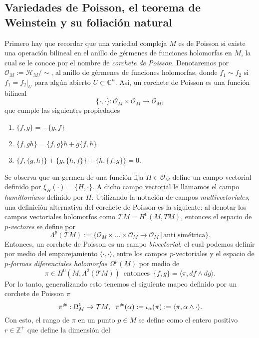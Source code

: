 \documentclass{article}
\newcommand{\zah}{\ensuremath{ \mathbb Z }}
\newcommand{\con}{\ensuremath{\mathbb{C}^n}}
\begin{document}
\subsection{Variedades de Poisson, el teorema de Weinstein y su foliaci\'on natural}
\noindent Primero hay que recordar que una variedad compleja $M$ es de Poisson si existe una operaci\'on bilineal en el anillo de g\'ermenes de 
funciones holomorfas en $M$, la cual se le conoce por el nombre de \emph{corchete de Poisson}.
Denotaremos por $\mathcal{O}_M:=\mathcal{H}_M/\sim$, al anillo de g\'ermenes de funciones holomorfas, donde $f_1\sim f_2$ si
$f_1=f_2|_U$ para alg\'un abierto $U\subset\con$. As\'i, un corchete de Poisson es una funci\'on bilineal
\[
\{\cdot,\cdot\}:\mathcal{O}_M\times\mathcal{O}_M\rightarrow\mathcal{O}_M,
\]
que cumple las siguientes propiedades
\begin{enumerate}
\item $\{f,g\} = -\{g,f\}$
\item $\{f,gh\}=\{f,g\}h + g\{f,h\}$
\item $\{f,\{g,h\}\}+\{g,\{h,f\}\} + \{h,\{ f,g\}\}=0$.
\end{enumerate}
\noindent Se observa que un germen de una funci\'on fija $H\in\mathcal{O}_M$ define un campo vectorial definido por $\xi_H(\cdot)=\{H,\cdot\}$.
A dicho campo vectorial le llamamos el campo \emph{hamiltoniano} definido por $H$. Utilizando la notaci\'on de campos \emph{multivectoriales}, 
una definici\'on alternativa del corchete de Poisson es la siguiente: al denotar los campos vectoriales holomorfos como $\mathcal{T}M=H^0(M,TM)$,
entonces el espacio de \emph{$p$-vectores} se define por 
\[
        \Lambda^{p}(\mathcal{T}M):=\{\mathcal{O}_M\times\dots\times\mathcal{O}_M\rightarrow\mathcal{O}_M\,\vert\,\text{anti sim\'etrica}\}.
\]
Entonces, un corchete de Poisson es un campo \emph{bivectorial}, el cual podemos definir por medio del emparejamiento $\langle\cdot,\cdot\rangle$,
entre los campos $p$-vectoriales y el espacio de \emph{$p$-formas diferenciales holomorfas} $\Omega^{p}(M)$ por medio de
\[
        \pi\in H^0(M,\Lambda^2(\mathcal{T}M))\,\text{ entonces }\,\{f,g\}=\langle \pi,df\wedge dg\rangle.
\]
Por lo tanto, generalizando esto tenemos el siguiente mapeo definido por un corchete de Poisson $\pi$
\[
        \pi^{\#}:\Omega^1_M\rightarrow\mathcal{T}M,\hspace{0.2cm}\pi^{\#}(\alpha):=\iota_{\alpha}(\pi):=\langle\pi,\alpha\wedge\cdot\rangle.
\]
\noindent Con esto, el rango de $\pi$ en un punto $p\in M$ se define como el entero positivo $r\in \zah^{+}$ que define la dimensi\'on del
\end{document}
